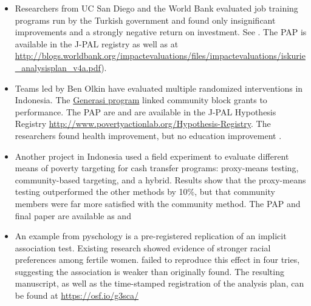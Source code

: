 \documentclass[12pt] {article}
\begin{document}
\begin{itemize}
\item
Researchers from UC San Diego and the World Bank evaluated job training programs run by the Turkish government and found only insignificant improvements and a strongly negative return on investment. See \cite{almeida_impact_2012, vocationalTurkey}. The PAP is available in the J-PAL registry as well as at
\url{http://blogs.worldbank.org/impactevaluations/files/impactevaluations/iskurie_analysisplan_v4a.pdf}).


\item 
Teams led by Ben Olkin have evaluated multiple randomized interventions in Indonesia. The \href{http://www.povertyactionlab.org/evaluation/project-generasi-conditional-community-block-grants-indonesia}{Generasi program} linked community block grants to performance. The PAP are \cite{olken_generasi_2009, olken_generasi_2010} and are available in the J-PAL Hypothesis Registry \url{http://www.povertyactionlab.org/Hypothesis-Registry}. The researchers found health improvement, but no education improvement \cite{olken_indonesias_2010, olken_should_2014}.

\item 
Another project in Indonesia used a field experiment to evaluate different means of poverty targeting for cash transfer programs: proxy-means testing, community-based targeting, and a hybrid. Results show that the proxy-means testing outperformed the other methods by 10\%, but that community members were far more satisfied with the community method. The PAP and final paper are available as \cite{olken_targeting_2009} and \cite{alatas_targeting_2012}

\item
An example from pyschology is a pre-registered replication of an implicit association test. Existing research showed evidence of stronger racial preferences among fertile women. \cite{NosekPreRegistered} failed to reproduce this effect in four tries, suggesting the association is weaker than originally found. The resulting manuscript, as well as the time-stamped registration of the analysis plan, can be found at \url{https://osf.io/g3sca/}
\end{itemize}
\end{document}
